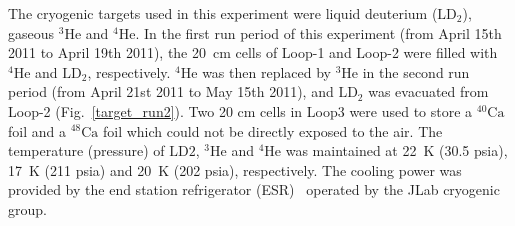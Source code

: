   The cryogenic targets used in this experiment were liquid deuterium ($\mathrm{LD_{2}}$), gaseous $\mathrm{^{3}He}$ and $\mathrm{^{4}He}$. In the first run period of this experiment (from April 15th 2011 to April 19th 2011), the 20~cm cells of Loop-1 and Loop-2 were filled with $\mathrm{^{4}He}$ and $\mathrm{LD_{2}}$, respectively. $\mathrm{^{4}He}$ was then replaced by $\mathrm{^{3}He}$ in the second run period (from April 21st 2011 to May 15th 2011), and $\mathrm{LD_{2}}$ was evacuated from Loop-2 (Fig.~\ref{target_run2}). Two 20 cm cells in Loop3 were used to store a $\mathrm{^{40}Ca}$ foil and a $\mathrm{^{48}Ca}$ foil which could not be directly exposed to the air. The temperature (pressure) of $\mathrm{LD{2}}$, $\mathrm{^{3}He}$ and $\mathrm{^{4}He}$ was maintained at 22~K (30.5 psia), 17~K (211 psia) and 20~K (202 psia), respectively. The cooling power was provided by the end station refrigerator (ESR)~\cite{cryo_grp} operated by the JLab cryogenic group. 
